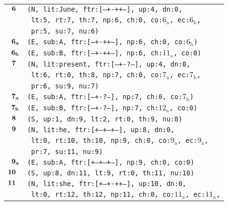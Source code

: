 \documentclass{article}
\begin{document}
\begin{minipage}{\textwidth}
{\begin{tabular}{|r|l|}
    ${\textbf{\textrm{6}}_{\phantom{z}}}$ & \texttt{\texttt{(N,~lit:June,~ftr:[---+-++--],~up:4,~dn:0,}} \\
    & \texttt{\texttt{~lt:5,~rt:7,~th:7,~np:6,~ch:0,~co:${\textrm{6}_{\textrm{a}}}$,~ec:${\textrm{6}_{\textrm{b}}}$,}} \\
    & \texttt{\texttt{~pr:5,~su:7,~nu:6)}} \\
    ${\textbf{\textrm{6}}_{\textbf{\textrm{a}}}}$ & \texttt{\texttt{(E,~sub:A,~ftr:[---+-++--],~np:6,~ch:0,~co:${\textrm{6}_{\textrm{b}}}$)}} \\
    ${\textbf{\textrm{6}}_{\textbf{\textrm{b}}}}$ & \texttt{\texttt{(E,~sub:B,~ftr:[---+-++--],~np:6,~ch:${\textrm{11}_{\textrm{a}}}$,~co:0)}} \\
    ${\textbf{\textrm{7}}_{\phantom{z}}}$ & \texttt{\texttt{(N,~lit:present,~ftr:[---+-?---],~up:4,~dn:0,}} \\
    & \texttt{\texttt{~lt:6,~rt:0,~th:8,~np:7,~ch:0,~co:${\textrm{7}_{\textrm{a}}}$,~ec:${\textrm{7}_{\textrm{b}}}$,}} \\
    & \texttt{\texttt{~pr:6,~su:9,~nu:7)}} \\
    ${\textbf{\textrm{7}}_{\textbf{\textrm{a}}}}$ & \texttt{\texttt{(E,~sub:A,~ftr:[---+-?---],~np:7,~ch:0,~co:${\textrm{7}_{\textrm{b}}}$)}} \\
    ${\textbf{\textrm{7}}_{\textbf{\textrm{b}}}}$ & \texttt{\texttt{(E,~sub:B,~ftr:[---+-?---],~np:7,~ch:${\textrm{12}_{\textrm{a}}}$,~co:0)}} \\
    ${\textbf{\textrm{8}}_{\phantom{z}}}$ & \texttt{\texttt{(S,~up:1,~dn:9,~lt:2,~rt:0,~th:9,~nu:8)}} \\
    ${\textbf{\textrm{9}}_{\phantom{z}}}$ & \texttt{\texttt{(N,~lit:he,~ftr:[+--+--+--],~up:8,~dn:0,}} \\
    & \texttt{\texttt{~lt:0,~rt:10,~th:10,~np:9,~ch:0,~co:${\textrm{9}_{\textrm{a}}}$,~ec:${\textrm{9}_{\textrm{a}}}$,}} \\
    & \texttt{\texttt{~pr:7,~su:11,~nu:9)}} \\
    ${\textbf{\textrm{9}}_{\textbf{\textrm{a}}}}$ & \texttt{\texttt{(E,~sub:A,~ftr:[+--+--+--],~np:9,~ch:0,~co:0)}} \\
    ${\textbf{\textrm{10}}_{\phantom{z}}}$ & \texttt{\texttt{(S,~up:8,~dn:11,~lt:9,~rt:0,~th:11,~nu:10)}} \\
    ${\textbf{\textrm{11}}_{\phantom{z}}}$ & \texttt{\texttt{(N,~lit:she,~ftr:[+--+-++--],~up:10,~dn:0,}} \\
    & \texttt{\texttt{~lt:0,~rt:12,~th:12,~np:11,~ch:0,~co:${\textrm{11}_{\textrm{a}}}$,~ec:${\textrm{11}_{\textrm{a}}}$,}} \\

\end{tabular}}
\end{minipage}
\end{document}
